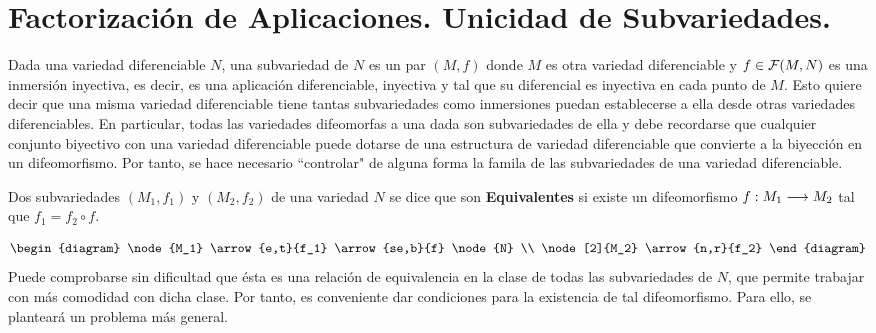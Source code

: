 \documentclass[cursovd_portada.tex]{subfiles}
\begin{document}
\section{Factorizaci\'{o}n de Aplicaciones. Unicidad de Subvariedades.}
\hs Dada una variedad diferenciable $N$, una subvariedad de $N$ es un par $(M,f)$ donde $M$ es otra variedad
diferenciable y $f\in{\cal F}(M,N)$ es una inmersi\'{o}n inyectiva, es decir, es una aplicaci\'{o}n diferenciable,
inyectiva y tal que su diferencial es inyectiva en cada punto de $M$. Esto quiere decir que una misma variedad
diferenciable tiene tantas subvariedades como inmersiones puedan establecerse a ella desde otras variedades
diferenciables. En particular, todas las variedades difeomorfas a una dada son subvariedades de ella y debe
recordarse que cualquier conjunto biyectivo con una variedad diferenciable puede dotarse de una estructura de
variedad diferenciable que convierte a la biyecci\'{o}n en un difeomorfismo. Por tanto, se hace necesario ``controlar"
de alguna forma la famila de las subvariedades de una variedad diferenciable.
\begin{defi}
Dos subvariedades $(M_1,f_1)$ y $(M_2,f_2)$ de una variedad $N$ se
dice que son {\bf Equivalentes} si existe un difeomorfismo
$f:M_1\longrightarrow M_2$ tal que $f_1=f_2\circ f$.
\end{defi}
$$\begin{diagram}
\node{M_1} \arrow{e,t}{f_1} \arrow{se,b}{f} \node{N} \\
\node[2]{M_2} \arrow{n,r}{f_2}
\end{diagram}$$
\hs Puede comprobarse sin dificultad que \'{e}sta es una
relaci\'{o}n de equivalencia en la clase de todas las
subvariedades de $N$, que permite trabajar con m\'{a}s comodidad
con dicha clase. Por tanto, es conveniente dar condiciones para la
existencia de tal difeomorfismo. Para ello, se plantear\'{a} un
problema m\'{a}s general.
\end{document}
